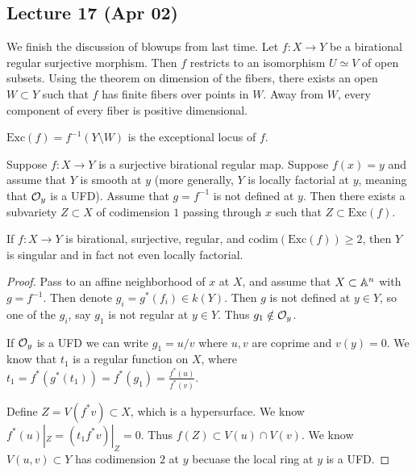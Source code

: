 \documentclass[twoside, 10pt]{article}
\begin{document}
    \subsection{Lecture 17 (Apr 02)} We finish the discussion of blowups from
    last time. Let $f:X \to Y$ be a birational regular surjective morphism.
    Then $f$ restricts to an isomorphism $U \simeq V$ of open subsets. Using
    the theorem on dimension of the fibers, there exists an open $W \subset Y$
    such that $f$ has finite fibers over points in $W$. Away from $W$, every
    component of every fiber is positive dimensional.

    \begin{defn} $\mathrm{Exc}(f) = f^{-1}(Y \setminus W)$
    is the exceptional locus of $f$.  \end{defn}

    \begin{thm} Suppose $f:X \to Y$ is a surjective birational regular map.
        Suppose $f(x) = y$ and assume that $Y$ is smooth at $y$ (more
        generally, $Y$ is locally factorial at $y$, meaning that $\mathcal{O}_y$ is
        a UFD). Assume that $g = f^{-1}$ is not defined at $y$. Then there
        exists a subvariety $Z \subset X$ of codimension $1$ passing through
    $x$ such that $Z \subset \mathrm{Exc}(f)$.  \end{thm}
    
    \begin{cor} If $f:X \to Y$ is birational, surjective, regular, and
        $\mathrm{codim}(\mathrm{Exc}(f)) \geq 2$, then $Y$ is singular and in
        fact not even locally factorial.  \begin{proof} Pass to an affine
            neighborhood of $x$ at $X$, and assume that $X \subset \mathbb{A}^n$ with
            $g = f^{-1}$. Then denote $g_i = g^*(f_i) \in k(Y)$. Then $g$ is
            not defined at $y \in Y$, so one of the $g_i$, say $g_1$ is not
            regular at $y \in Y$. Thus $g_1 \notin \mathcal{O}_y$.
            
            If $\mathcal{O}_y$ is a UFD we can write $g_1 = u/v$ where $u,v$ are
            coprime and $v(y) = 0$. We know that $t_1$ is a regular function on
            $X$, where $t_1 = f^*(g^*(t_1)) = f^*(g_1) =
            \frac{f^*(u)}{f^*(v)}$.

            Define $Z = V(f^* v) \subset X$, which is a hypersurface. We know
            $f^*(u)|_Z = (t_1 f^* v)|_Z = 0$. Thus $f(Z) \subset V(u) \cap
            V(v)$. We know $V(u,v) \subset Y$ has codimension $2$ at $y$
            becuase the local ring at $y$ is a UFD.  \end{proof} \end{cor}
\end{document}
